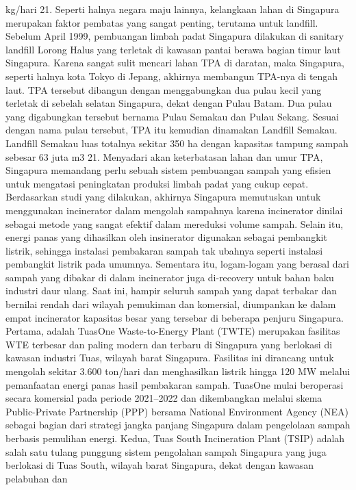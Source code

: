 \documentclass[
  letterpaper,
  DIV=11,
  numbers=noendperiod]{scrreprt}
\begin{document}
kg/hari 21. Seperti halnya negara maju lainnya, kelangkaan lahan di
Singapura merupakan faktor pembatas yang sangat penting, terutama untuk
landfill. Sebelum April 1999, pembuangan limbah padat Singapura
dilakukan di sanitary landfill Lorong Halus yang terletak di kawasan
pantai berawa bagian timur laut Singapura. Karena sangat sulit mencari
lahan TPA di daratan, maka Singapura, seperti halnya kota Tokyo di
Jepang, akhirnya membangun TPA-nya di tengah laut. TPA tersebut dibangun
dengan menggabungkan dua pulau kecil yang terletak di sebelah selatan
Singapura, dekat dengan Pulau Batam. Dua pulau yang digabungkan tersebut
bernama Pulau Semakau dan Pulau Sekang. Sesuai dengan nama pulau
tersebut, TPA itu kemudian dinamakan Landfill Semakau. Landfill Semakau
luas totalnya sekitar 350 ha dengan kapasitas tampung sampah sebesar 63
juta m3 21. Menyadari akan keterbatasan lahan dan umur TPA, Singapura
memandang perlu sebuah sistem pembuangan sampah yang efisien untuk
mengatasi peningkatan produksi limbah padat yang cukup cepat.
Berdasarkan studi yang dilakukan, akhirnya Singapura memutuskan untuk
menggunakan incinerator dalam mengolah sampahnya karena incinerator
dinilai sebagai metode yang sangat efektif dalam mereduksi volume
sampah. Selain itu, energi panas yang dihasilkan oleh insinerator
digunakan sebagai pembangkit listrik, sehingga instalasi pembakaran
sampah tak ubahnya seperti instalasi pembangkit listrik pada umumnya.
Sementara itu, logam-logam yang berasal dari sampah yang dibakar di
dalam incinerator juga di-recovery untuk bahan baku industri daur ulang.
Saat ini, hampir seluruh sampah yang dapat terbakar dan bernilai rendah
dari wilayah pemukiman dan komersial, diumpankan ke dalam empat
incinerator kapasitas besar yang tersebar di beberapa penjuru Singapura.
Pertama, adalah TuasOne Waste-to-Energy Plant (TWTE) merupakan fasilitas
WTE terbesar dan paling modern dan terbaru di Singapura yang berlokasi
di kawasan industri Tuas, wilayah barat Singapura. Fasilitas ini
dirancang untuk mengolah sekitar 3.600 ton/hari dan menghasilkan listrik
hingga 120 MW melalui pemanfaatan energi panas hasil pembakaran sampah.
TuasOne mulai beroperasi secara komersial pada periode 2021--2022 dan
dikembangkan melalui skema Public-Private Partnership (PPP) bersama
National Environment Agency (NEA) sebagai bagian dari strategi jangka
panjang Singapura dalam pengelolaan sampah berbasis pemulihan energi.
Kedua, Tuas South Incineration Plant (TSIP) adalah salah satu tulang
punggung sistem pengolahan sampah Singapura yang juga berlokasi di Tuas
South, wilayah barat Singapura, dekat dengan kawasan pelabuhan dan
\end{document}
